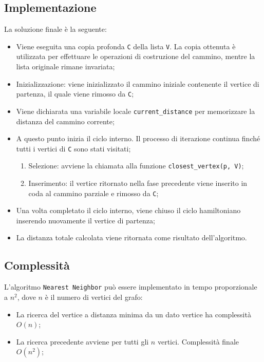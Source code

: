 \subsection{Implementazione}
 La soluzione finale è la seguente:
\begin{itemize}
	\item Viene eseguita una copia profonda \texttt{C} della lista \texttt{V}. La copia ottenuta è utilizzata per effettuare le operazioni di costruzione del cammino, mentre la lista originale rimane invariata;
	\item Inizializzazione: viene inizializzato il cammino iniziale contenente il vertice di partenza, il quale viene rimosso da \texttt{C};
	\item Viene dichiarata una variabile locale \texttt{current\_distance} per memorizzare la distanza del cammino corrente;
	\item A questo punto inizia il ciclo interno. Il processo di iterazione continua finché tutti i vertici di \texttt{C} sono stati visitati;
	\begin{enumerate}
		\item Selezione: avviene la chiamata alla funzione \texttt{closest\_vertex(p, V)};
		\item Inserimento: il vertice ritornato nella fase precedente viene inserito in coda al cammino parziale e rimosso da \texttt{C};
	\end{enumerate}  
	\item Una volta completato il ciclo interno, viene chiuso il ciclo hamiltoniano inserendo nuovamente il vertice di partenza;
	\item La distanza totale calcolata viene ritornata come risultato dell'algoritmo.
\end{itemize}

\subsection{Complessità}
L'algoritmo \texttt{Nearest Neighbor} può essere implementato in tempo proporzionale a $n^2$, dove $n$ è il numero di vertici del grafo:
\begin{itemize}
	\item La ricerca del vertice a distanza minima da un dato vertice ha complessità $O(n)$;
	\item La ricerca precedente avviene per tutti gli $n$ vertici. Complessità finale $O(n^2)$;
	
\end{itemize}
\pagebreak